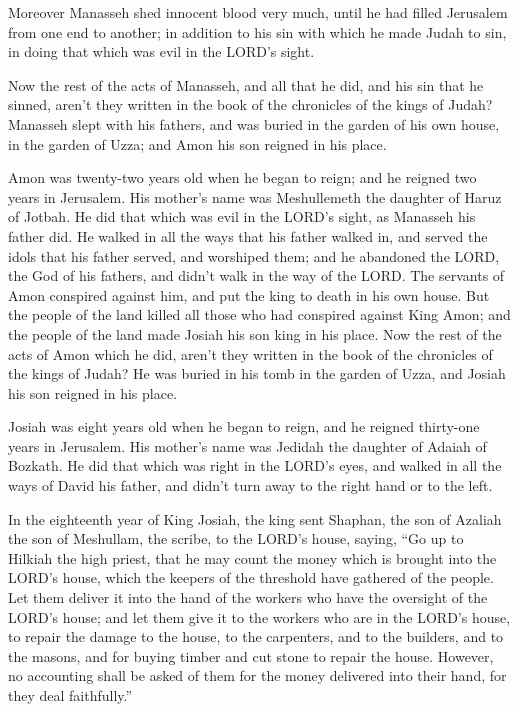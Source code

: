 \myverse{}Moreover Manasseh shed innocent blood very much, until he had
filled Jerusalem from one end to another; in addition to his sin with which he made Judah to sin, in doing
that which was evil in the LORD’s sight.

\myverse{}Now the rest of the acts of Manasseh, and all that he did, and
his sin that he sinned, aren’t they written in the book of the chronicles of the kings of Judah?
\myverse{}Manasseh slept with his fathers, and was buried in the garden of his own
house, in the garden of Uzza; and Amon his son reigned in his place.

\myverse{}Amon was twenty-two years old when he began to reign; and he
reigned two years in Jerusalem. His mother’s name was Meshullemeth the daughter of Haruz of Jotbah.
\myverse{}He did that which was evil in the LORD’s sight, as Manasseh his father did.
\myverse{}He walked in all the ways that his father walked in, and served the idols
that his father served, and worshiped them;
\myverse{}and he abandoned the LORD, the God of his fathers, and didn’t walk in the
way of the LORD.
\myverse{}The servants of Amon conspired against him, and put the king to death in
his own house.
\myverse{}But the people of the land killed all those who had conspired against King
Amon; and the people of the land made Josiah his son king in his place.
\myverse{}Now the rest of the acts of Amon which he did, aren’t they written in the
book of the chronicles of the kings of Judah?
\myverse{}He was buried in his tomb in the garden of Uzza, and Josiah his son reigned
in his place.


\mychapter{} \myverse*{}Josiah was eight years old when he began to reign, and he reigned
thirty-one years in Jerusalem. His mother’s name was Jedidah the daughter of Adaiah of Bozkath.
\myverse{}He did that which was right in the LORD’s eyes, and walked in all the ways
of David his father, and didn’t turn away to the right hand or to the left.

\myverse{}In the eighteenth year of King Josiah, the king sent Shaphan,
the son of Azaliah the son of Meshullam, the scribe, to the LORD’s house, saying,
\myverse{}“Go up to Hilkiah the high priest, that he may count the money which is brought
into the LORD’s house, which the keepers of the threshold have gathered of the people.
\myverse{}Let them deliver it into the hand of the workers who have the oversight of
the LORD’s house; and let them give it to the workers who are in the LORD’s house, to repair the damage
to the house,
\myverse{}to the carpenters, and to the builders, and to the masons, and for buying timber
and cut stone to repair the house.
\myverse{}However, no accounting shall be asked of them for the money delivered into
their hand, for they deal faithfully.”

